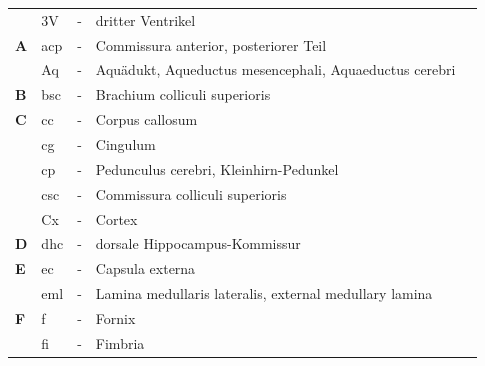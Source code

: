 \begin{table}[H]
\begin{tabular}{llcll}
           & 3V  & -          & dritter Ventrikel                                                       & \multicolumn{1}{c}{\textbf{}} \\
\textbf{A} & acp & -          & Commissura anterior, posteriorer Teil                                   & \multicolumn{1}{c}{}          \\
\textbf{}  & Aq  & -          & Aquädukt, Aqueductus mesencephali, Aquaeductus cerebri                  & \multicolumn{1}{c}{}          \\
\textbf{B} & bsc & -          & Brachium colliculi superioris                                           & \multicolumn{1}{c}{}          \\
\textbf{C} & cc  & -          & Corpus callosum                                                         & \multicolumn{1}{c}{\textbf{}} \\
\textbf{}  & cg  & -          & Cingulum                                                                & \multicolumn{1}{c}{\textbf{}} \\
\textbf{ } & cp  & -          & Pedunculus cerebri, Kleinhirn-Pedunkel                                  & \multicolumn{1}{c}{\textbf{}} \\
\textbf{ } & csc & -          & Commissura colliculi superioris                                         & \multicolumn{1}{c}{\textbf{}} \\
\textbf{}  & Cx  & -          & Cortex                                                                  & \multicolumn{1}{c}{}          \\
\textbf{D} & dhc & -          & dorsale Hippocampus-Kommissur                                           & \multicolumn{1}{c}{}          \\
\textbf{E} & ec  & -          & Capsula externa                                                         &                               \\
\textbf{ } & eml & -          & Lamina medullaris lateralis, external medullary lamina                  &                               \\
\textbf{F} & f   & -          & Fornix                                                                  &                               \\
\textbf{}  & fi  & -          & Fimbria                                                                 &                               \\

\end{tabular}
\end{table}
